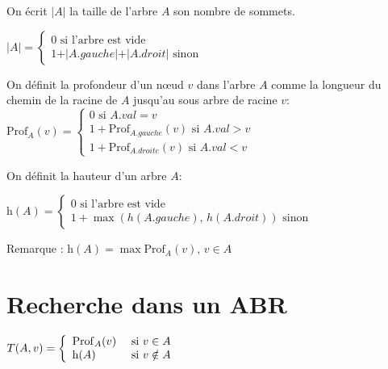 \begin{definition}
On écrit $\vert A \vert$ la taille de l'arbre $A$ son nombre de sommets.

$ \vert A \vert = 
   \left \{
   \begin{array}{l}
      0 \text{ si l'arbre est vide} \\
      1 + \vert A.gauche \vert + \vert A.droit \vert \text{ sinon}
   \end{array}
   \right .
$
\end{definition}

\begin{definition}
On définit la profondeur d'un nœud $v$ dans l'arbre $A$ comme la longueur du chemin de la racine de $A$ jusqu'au sous arbre de racine $v$:\\[0.1cm]
$ \mathrm{Prof}_{A}(v) = 
   \left \{
   \begin{array}{l}
      0 \text{ si } A.val = v \\
      1 + \mathrm{Prof}_{A.gauche}(v) \text{ si } A.val > v \\
      1 + \mathrm{Prof}_{A.droite}(v) \text{ si } A.val < v
   \end{array}
   \right .
$
\end{definition}

\begin{definition}
On définit la hauteur d'un arbre $A$:

\vspace{0.2cm}

$ \mathrm{h}(A) = 
   \left \{
   \begin{array}{l}
      0 \text{ si l'arbre est vide} \\
      1 + \max ( h(A.gauche),\, h(A.droit) ) \text{ sinon}
   \end{array}
   \right .
$
\end{definition}
Remarque : $\mathrm{h}(A) = \max {\mathrm{Prof}_{A}(v),\, v \in A}$

\section{Recherche dans un ABR}


\begin{proposition}
$ T(A, v) = 
   \left \{
   \begin{array}{l l}
		\mathrm{Prof}_{A}(v) & \text{ si } v \in A \\
		\mathrm{h}(A) & \text{ si } v \notin A
   \end{array}
   \right .
$
\end{proposition}\label{pro:coutabr}


